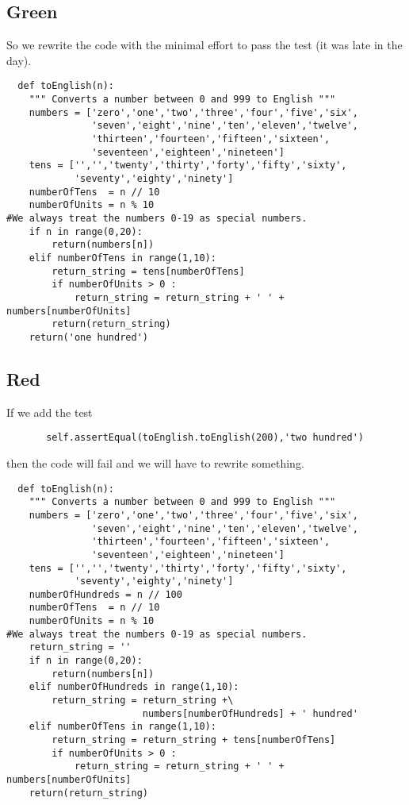 \documentclass{paper}
\begin{document}
\subsection{Green}
So we rewrite the code with the minimal effort to pass the test (it
was late in the day).
\begin{lstlisting}
  def toEnglish(n):
    """ Converts a number between 0 and 999 to English """
    numbers = ['zero','one','two','three','four','five','six',
               'seven','eight','nine','ten','eleven','twelve',
               'thirteen','fourteen','fifteen','sixteen',
               'seventeen','eighteen','nineteen']
    tens = ['','','twenty','thirty','forty','fifty','sixty',
            'seventy','eighty','ninety']
    numberOfTens  = n // 10
    numberOfUnits = n % 10
#We always treat the numbers 0-19 as special numbers.
    if n in range(0,20):
        return(numbers[n])
    elif numberOfTens in range(1,10):
        return_string = tens[numberOfTens]
        if numberOfUnits > 0 :
            return_string = return_string + ' ' + numbers[numberOfUnits]
        return(return_string)
    return('one hundred')
\end{lstlisting}
\subsection{Red}
If we add the test
\begin{lstlisting}
       self.assertEqual(toEnglish.toEnglish(200),'two hundred')
\end{lstlisting}
then the code will fail and we will have to rewrite something.
\begin{lstlisting}
  def toEnglish(n):
    """ Converts a number between 0 and 999 to English """
    numbers = ['zero','one','two','three','four','five','six',
               'seven','eight','nine','ten','eleven','twelve',
               'thirteen','fourteen','fifteen','sixteen',
               'seventeen','eighteen','nineteen']
    tens = ['','','twenty','thirty','forty','fifty','sixty',
            'seventy','eighty','ninety']
    numberOfHundreds = n // 100
    numberOfTens  = n // 10
    numberOfUnits = n % 10
#We always treat the numbers 0-19 as special numbers.
    return_string = ''
    if n in range(0,20):
        return(numbers[n])
    elif numberOfHundreds in range(1,10):
        return_string = return_string +\
                        numbers[numberOfHundreds] + ' hundred'
    elif numberOfTens in range(1,10):
        return_string = return_string + tens[numberOfTens]
        if numberOfUnits > 0 :
            return_string = return_string + ' ' + numbers[numberOfUnits]
    return(return_string)
\end{lstlisting}
\end{document}
